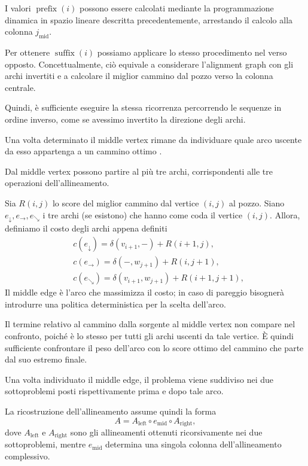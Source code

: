 I valori $\operatorname{prefix}(i)$ possono essere calcolati mediante la programmazione dinamica in spazio lineare descritta precedentemente,
arrestando il calcolo alla colonna $j_{\mathrm{mid}}$.

Per ottenere $\operatorname{suffix}(i)$ possiamo applicare lo stesso procedimento nel verso opposto.
Concettualmente, ciò equivale a considerare l'alignment graph con gli archi invertiti e a calcolare il miglior cammino dal pozzo verso la colonna centrale.

Quindi, è sufficiente eseguire la stessa ricorrenza percorrendo le sequenze in ordine inverso, come se avessimo invertito la direzione degli archi.

Una volta determinato il middle vertex rimane da individuare quale arco uscente da esso appartenga a un cammino ottimo \cite[pp.~275--276]{compeau--pevzner}.

Dal middle vertex possono partire al più tre archi, corrispondenti alle tre operazioni dell'allineamento.

Sia $R(i,j)$ lo score del miglior cammino dal vertice $(i,j)$ al pozzo.
Siano $e_{\downarrow},e_{\rightarrow},e_{\searrow}$ i tre archi (se esistono) che hanno come coda il vertice $(i,j)$.
Allora, definiamo il costo degli archi appena definiti 
\[
    \begin{aligned}
        & c(e_{\downarrow}) = \delta( v_{i+1}, -) + R(i+1,j),\\
        & c(e_{\rightarrow}) = \delta(-, w_{j+1}) + R(i,j+1),\\
        & c(e_{\searrow}) = \delta( v_{i+1}, w_{j+1}) + R(i+1,j+1),
    \end{aligned}
\]
Il middle edge è l'arco che massimizza il costo; in caso di pareggio bisognerà introdurre una politica deterministica per la scelta dell'arco.

Il termine relativo al cammino dalla sorgente al middle vertex non compare nel confronto, poiché è lo stesso per tutti gli archi uscenti da tale vertice.
È quindi sufficiente confrontare il peso dell'arco con lo score ottimo del cammino che parte dal suo estremo finale.

Una volta individuato il middle edge, il problema viene suddiviso nei due sottoproblemi posti rispettivamente prima e dopo tale arco.

La ricostruzione dell'allineamento assume quindi la forma
\[
    A = A_{\mathrm{left}}\circ e_{\mathrm{mid}}\circ A_{\mathrm{right}},
\]
dove $A_{\mathrm{left}}$ e $A_{\mathrm{right}}$ sono gli allineamenti ottenuti ricorsivamente nei due sottoproblemi, mentre 
$e_{\mathrm{mid}}$ determina una singola colonna dell'allineamento complessivo.

